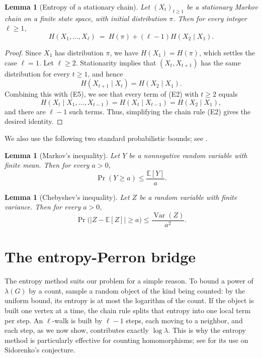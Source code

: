 \documentclass[11pt, a4paper]{article}
\newtheorem{lemma}[theorem]{Lemma}
\theoremstyle{definition}
\theoremstyle{plain}
\renewcommand{\le}{\leqslant}
\renewcommand{\ge}{\geqslant}
\newcommand{\EE}{\mathbb{E}}
\newcommand{\Var}{\operatorname{Var}}
\begin{document}
\begin{lemma}[Entropy of a stationary chain]
\label{lem:chain-entropy}
Let $(X_t)_{t\ge 1}$ be a stationary Markov chain on a
finite state space, with initial distribution $\pi$.
Then for every integer $\ell \ge 1$,
\[
  H(X_1,\ldots ,X_\ell)
 \ = \ H(\pi)+(\ell -1)H(X_2\mid X_1).
\]
\end{lemma}

\begin{proof}
Since $X_1$ has distribution $\pi$, we have $H(X_1)=H(\pi)$,
which settles the case $\ell =1$. Let $\ell \ge 2$.
Stationarity implies that $(X_t,X_{t+1})$ has the same
distribution for every $t\ge 1$, and hence
$$H(X_{t+1}\mid X_t)=H(X_2\mid X_1).$$
 Combining this
with (E5), we see that every term of (E2) with $t\ge 2$ equals 
\[
  H(X_t\mid X_1,\ldots ,X_{t-1})
  =H(X_t\mid X_{t-1})
  =H(X_2\mid X_1),
\]
and there are $\ell -1$ such terms. Thus, simplifying the chain rule (E2) gives the desired identity. 
\end{proof}
 

We also use the following two standard probabilistic bounds; see
\cite{AS2016, ZhaoYufei}. 

\begin{lemma}[Markov's inequality]
\label{lem:markov}
Let $Y$ be a nonnegative random variable with finite
mean. Then for every $a>0$,
\[
  \Pr (Y\ge a)\le \frac{\EE [Y] }{a}.
\]
\end{lemma}



\begin{lemma}[Chebyshev's inequality]
\label{lem:chebyshev}
Let $Z$ be a random variable with finite variance.
Then for every $a>0$,
\[
  \Pr \bigl( \big\lvert Z-\EE [Z] \big\rvert \ge a\bigr)
  \le \frac{\Var (Z)}{a^2}.
\]
\end{lemma}







\section{The entropy-Perron bridge}
\label{sec:entropy}


The entropy method suits our problem for a simple reason. To bound a power of
$\lambda (G)$ by a count, sample a random object of the kind being counted: by
the uniform bound, its entropy is at most the logarithm of the count. If the
object is built one vertex at a time, the chain rule splits that entropy into
one local term per step. An $\ell$-walk is built by $\ell -1$ steps, each moving to a neighbor, 
and each step, as we now show, contributes exactly $\log \lambda$. 
This is why the entropy method is particularly effective  for counting homomorphisms; see
\cite{Szegedy2014, KLL2016, CKLL2018} for its use on Sidorenko's conjecture. 
\end{document}
